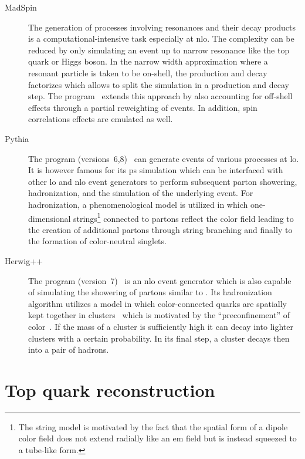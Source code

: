 \begin{description}
\item[MadSpin] The generation of processes involving resonances and their decay products is a computational-intensive task especially at \gls{nlo}. The complexity can be reduced by only simulating an event up to narrow resonance like the top quark or Higgs boson. In the narrow width approximation where a resonant particle is taken to be on-shell, the production and decay factorizes which allows to split the simulation in a production and decay step. The \MADSPIN[] program~\cite{Artoisenet:2012st} extends this approach by also accounting for off-shell effects through a partial reweighting of events. In addition, spin correlations effects are emulated as well.

\item[Pythia] The \PYTHIA[] program (versions~6,8)~\cite{Sjostrand:2006za,Sjostrand:2014zea} can generate events of various processes at \gls{lo}. It is however famous for its \gls{ps} simulation which can be interfaced with other \gls{lo} and \gls{nlo} event generators to perform subsequent parton showering, hadronization, and the simulation of the underlying event. For hadronization, a phenomenological model is utilized in which one-dimensional strings\footnote{The string model is motivated by the fact that the spatial form of a dipole color field does not extend radially like an \gls{em} field but is instead squeezed to a tube-like form.} connected to partons reflect the color field leading to the creation of additional partons through string branching and finally to the formation of color-neutral singlets.

\item[Herwig++] The \HERWIG[] program (version~7)~\cite{Bellm:2015jjp} is an \gls{nlo} event generator which is also capable of simulating the showering of partons similar to \PYTHIA. Its hadronization algorithm utilizes a model in which color-connected quarks are spatially kept together in clusters~\cite{Webber:1983if} which is motivated by the ``preconfinement'' of color~\cite{Amati:1979fg}. If the mass of a cluster is sufficiently high it can decay into lighter clusters with a certain probability. In its final step, a cluster decays then into a pair of hadrons.
\end{description}




\section{Top quark reconstruction}
\label{sec:technique-topreco}

